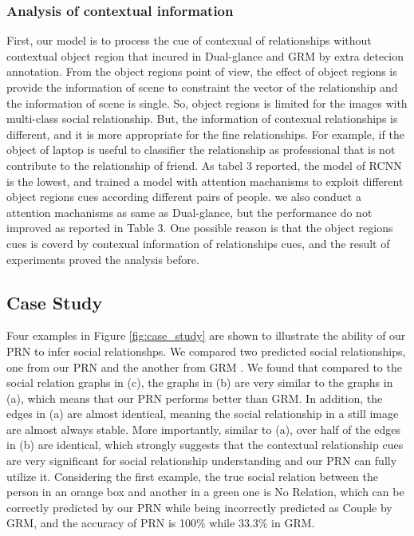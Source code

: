 \documentclass{article}
\begin{document}
\subsubsection{Analysis of contextual information}

First, our model is to process the cue of contexual of relationships without contextual object region that incured in Dual-glance and GRM by extra detecion annotation. 
From the object regions point of view, the effect of object regions is provide the information of scene to constraint the vector of the relationship and the information of scene is single. So, object regions is limited for the images with multi-class social relationship. But, the information of contexual relationships is different, and it is more appropriate for the fine relationships.
For example, if the object of laptop is useful to classifier the relationship as professional that is not contribute to the relationship of friend.
As tabel 3 reported, the model of RCNN is the lowest, and
 \cite{DBLP:conf/iccv/LiWZK17} trained a model with attention machanisms to exploit different object regions cues according different pairs of people. we also conduct a attention machanisms as same as Dual-glance, but the performance do not improved as reported in Table 3. 
One possible reason is that the object regions cues is coverd by contexual information of relationships cues, and the result of experiments proved the analysis before. 


\subsection{Case Study}\label{section:cs}

Four examples in Figure \ref{fig:case_study} are shown to illustrate the ability of our PRN to infer social relationshps. We compared two predicted social relationships, one from our PRN and the another from GRM \cite{DBLP:conf/ijcai/WangCRYCL18}. We found that compared to the social relation graphs in (c), the graphs in (b) are very similar to the graphs in (a), which means that our PRN performs better than GRM. In addition, the edges in (a) are almost identical, meaning the social relationship in a still image are almost always stable. More importantly, similar to (a), over half of the edges in (b) are identical, which strongly suggests that the contextual relationship cues are very significant for social relationship understanding and our PRN can fully utilize it. Considering the first example, the true social relation between the person in an orange box and another in a green one is No Relation, which can be correctly predicted by our PRN while being incorrectly predicted as Couple by GRM, and the accuracy of PRN is 100\% while 33.3\% in GRM.
\end{document}
